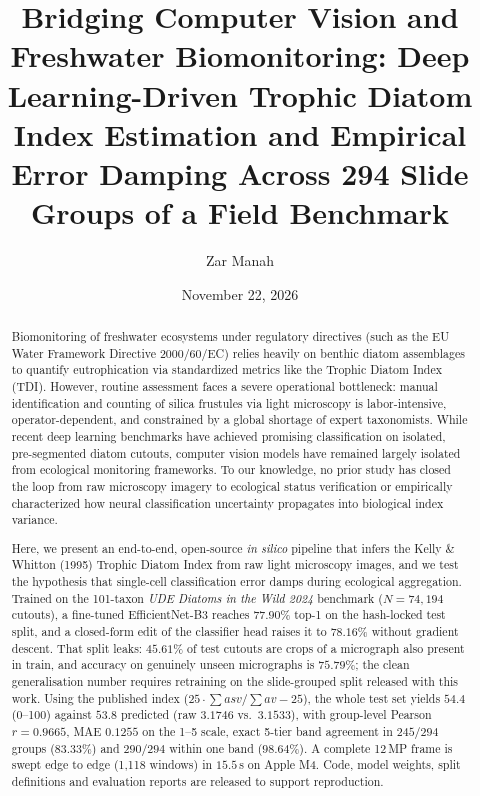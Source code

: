 \documentclass[10pt,twocolumn,a4paper]{article}
\title{\textbf{Bridging Computer Vision and Freshwater Biomonitoring: Deep Learning-Driven Trophic Diatom Index Estimation and Empirical Error Damping Across 294 Slide Groups of a Field Benchmark}}
\author[1]{Zar Manah}
\affil[1]{Independent Researcher, Madrid, Spain. ORCID: 0009-0007-8443-8999}
\date{November 22, 2026}
\begin{document}
\maketitle

\begin{abstract}
Biomonitoring of freshwater ecosystems under regulatory directives (such as the EU Water Framework Directive 2000/60/EC) relies heavily on benthic diatom assemblages to quantify eutrophication via standardized metrics like the Trophic Diatom Index (TDI). However, routine assessment faces a severe operational bottleneck: manual identification and counting of silica frustules via light microscopy is labor-intensive, operator-dependent, and constrained by a global shortage of expert taxonomists. While recent deep learning benchmarks have achieved promising classification on isolated, pre-segmented diatom cutouts, computer vision models have remained largely isolated from ecological monitoring frameworks. To our knowledge, no prior study has closed the loop from raw microscopy imagery to ecological status verification or empirically characterized how neural classification uncertainty propagates into biological index variance.

Here, we present an end-to-end, open-source \textit{in silico} pipeline that infers the Kelly \& Whitton (1995) Trophic Diatom Index from raw light microscopy images, and we test the hypothesis that single-cell classification error damps during ecological aggregation. Trained on the 101-taxon \textit{UDE Diatoms in the Wild 2024} benchmark ($N = 74{,}194$ cutouts), a fine-tuned EfficientNet-B3 reaches $77.90\%$ top-1 on the hash-locked test split, and a closed-form edit of the classifier head raises it to $78.16\%$ without gradient descent. That split leaks: $45.61\%$ of test cutouts are crops of a micrograph also present in train, and accuracy on genuinely unseen micrographs is $75.79\%$; the clean generalisation number requires retraining on the slide-grouped split released with this work. Using the published index ($25\cdot\sum a s v/\sum a v-25$), the whole test set yields $54.4$ (0--100) against $53.8$ predicted (raw $3.1746$ vs.\ $3.1533$), with group-level Pearson $r = 0.9665$, MAE $0.1255$ on the 1--5 scale, exact 5-tier band agreement in $245/294$ groups ($83.33\%$) and $290/294$ within one band ($98.64\%$). A complete 12\,MP frame is swept edge to edge (1,118 windows) in $15.5$\,s on Apple M4. Code, model weights, split definitions and evaluation reports are released to support reproduction.
\end{abstract}
\end{document}
